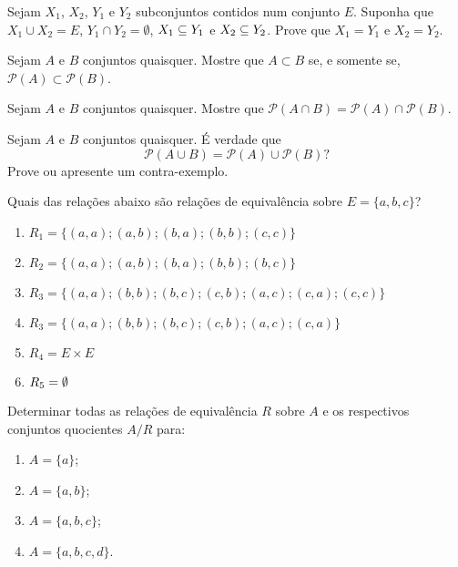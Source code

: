 \documentclass[12pt]{exam}
\begin{document}
    \vspace{.3cm}

    \questao{} Sejam $X_1$, $X_2$, $Y_1$ e $Y_2$ subconjuntos contidos num conjunto $E$. Suponha que $X_1 \cup X_2 = E$, $Y_1 \cap Y_2 = \emptyset$, $X_1 \subseteq Y_1$ e $X_2 \subseteq Y_2$. Prove que $X_1 = Y_1$ e $X_2 = Y_2$.

    \vspace{.3cm}

    \questao{} Sejam $A$ e $B$ conjuntos quaisquer. Mostre que $A \subset B$ se, e somente se, $\mathcal{P}(A) \subset \mathcal{P}(B)$.

    \vspace{.3cm}

    \questao{} Sejam $A$ e $B$ conjuntos quaisquer. Mostre que $\mathcal{P}(A \cap B) = \mathcal{P}(A) \cap \mathcal{P}(B)$.

    \vspace{.3cm}

    \questao{} Sejam $A$ e $B$ conjuntos quaisquer. É verdade que
    \[
       \mathcal{P}(A \cup B) = \mathcal{P}(A) \cup \mathcal{P}(B)?
    \]
    Prove ou apresente um contra-exemplo.

    \vspace{.3cm}

    \questao{} Quais das relações abaixo são relações de equivalência sobre $E = \{a,b,c\}$?
    \begin{enumerate}[label={\alph*})]
        \item $R_1 = \{(a,a);(a,b);(b,a);(b,b);(c,c)\}$

        \item $R_2 = \{(a,a);(a,b);(b,a);(b,b);(b,c)\}$

        \item $R_3 = \{(a,a);(b,b);(b,c);(c,b);(a,c);(c,a);(c,c)\}$

        \item $R_3 = \{(a,a);(b,b);(b,c);(c,b);(a,c);(c,a)\}$

        \item $R_4 = E \times E$

        \item $R_5 = \emptyset$
    \end{enumerate}

    \vspace{.3cm}

    \questao{} Determinar todas as relações de equivalência
    $R$ sobre $A$ e os respectivos conjuntos quocientes $A/R$ para:
    \begin{enumerate}[label={\alph*})]
        \item $A=\{a\}$;

        \item $A=\{a,b\}$;

        \item $A=\{a,b,c\}$;

        \item $A=\{a,b,c,d\}$.
    \end{enumerate}
\end{document}
